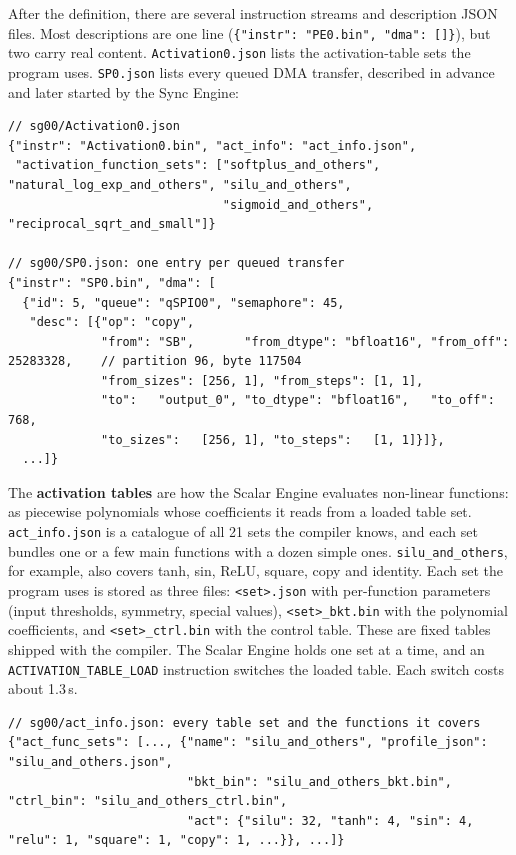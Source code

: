 \documentclass{article}
\newcommand{\us}{\,\textmu{}s\xspace}
\newcommand{\code}[1]{\texttt{#1}}
\begin{document}
After the definition, there are several instruction streams and description JSON files. Most descriptions are one line (\code{\{"instr": "PE0.bin", "dma": []\}}), but two carry real content. \code{Activation0.json} lists the activation-table sets the program uses. \code{SP0.json} lists every queued DMA transfer, described in advance and later started by the Sync Engine:

\begin{lstlisting}
// sg00/Activation0.json
{"instr": "Activation0.bin", "act_info": "act_info.json",
 "activation_function_sets": ["softplus_and_others", "natural_log_exp_and_others", "silu_and_others",
                              "sigmoid_and_others", "reciprocal_sqrt_and_small"]}

// sg00/SP0.json: one entry per queued transfer
{"instr": "SP0.bin", "dma": [
  {"id": 5, "queue": "qSPIO0", "semaphore": 45,
   "desc": [{"op": "copy",
             "from": "SB",       "from_dtype": "bfloat16", "from_off": 25283328,    // partition 96, byte 117504
             "from_sizes": [256, 1], "from_steps": [1, 1],
             "to":   "output_0", "to_dtype": "bfloat16",   "to_off": 768,
             "to_sizes":   [256, 1], "to_steps":   [1, 1]}]},
  ...]}
\end{lstlisting}

The \textbf{activation tables} are how the Scalar Engine evaluates non-linear functions: as piecewise polynomials whose coefficients it reads from a loaded table set. \code{act\_info.json} is a catalogue of all 21 sets the compiler knows, and each set bundles one or a few main functions with a dozen simple ones. \code{silu\_and\_others}, for example, also covers tanh, sin, ReLU, square, copy and identity. Each set the program uses is stored as three files: \code{<set>.json} with per-function parameters (input thresholds, symmetry, special values), \code{<set>\_bkt.bin} with the polynomial coefficients, and \code{<set>\_ctrl.bin} with the control table. These are fixed tables shipped with the compiler. The Scalar Engine holds one set at a time, and an \code{ACTIVATION\_TABLE\_LOAD} instruction switches the loaded table. Each switch costs about 1.3\us.

\begin{lstlisting}
// sg00/act_info.json: every table set and the functions it covers
{"act_func_sets": [..., {"name": "silu_and_others", "profile_json": "silu_and_others.json",
                         "bkt_bin": "silu_and_others_bkt.bin", "ctrl_bin": "silu_and_others_ctrl.bin",
                         "act": {"silu": 32, "tanh": 4, "sin": 4, "relu": 1, "square": 1, "copy": 1, ...}}, ...]}
\end{lstlisting}
\end{document}
